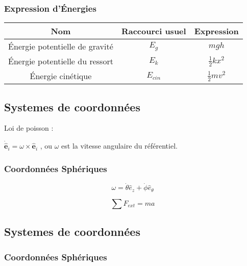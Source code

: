 \documentclass[10pt,a4paper]{article}
\begin{document}
\subsubsection{Expression d'Énergies}

\begin{tabular}{c|c|c}
Nom & Raccourci usuel & Expression \\
\hline
Énergie potentielle de gravité & $E_{g}$ & $mgh$ \\
Énergie potentielle du ressort & $E_k$ & $\frac{1}{2}kx^2$ \\
Énergie cinétique & $E_{cin}$ & $\frac{1}{2}mv^2$ \\
\end{tabular}

\pagebreak

\subsection{Systemes de coordonnées}

Loi de poisson :

\begin{center}
$\dot{\hat{\mathbf{e}}}_i = \omega \times \hat{\mathbf{e}}_i$ , ou $\omega$ est la vitesse angulaire du référentiel.
\end{center}



\subsubsection{Coordonnées Sphériques}

$$\omega = \dot\theta \hat e_z + \dot\phi \hat e_\theta$$

$$\sum F_{ext} = ma$$

\subsection{Systemes de coordonnées}
\subsubsection{Coordonnées Sphériques}
\end{document}
